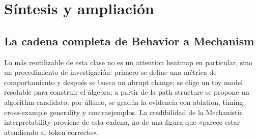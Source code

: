 \section{Síntesis y ampliación}

\subsection{La cadena completa de Behavior a Mechanism}

Lo más reutilizable de esta clase no es un attention heatmap en particular, sino un procedimiento de investigación: primero se define una métrica de comportamiento y después se busca un abrupt change; se elige un toy model resoluble para construir el álgebra; a partir de la path structure se propone un algorithm candidato; por último, se gradúa la evidencia con ablation, timing, cross-example generality y contraejemplos. La credibilidad de la Mechanistic interpretability proviene de esta cadena, no de una figura que «parece estar atendiendo al token correcto».

